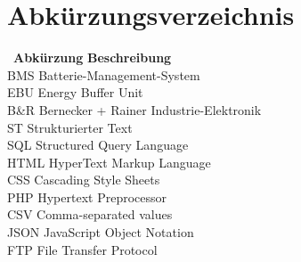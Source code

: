 
\chapter*{Abkürzungsverzeichnis}\thispagestyle{fancy}

\begin{tabbing}
\ \= \textbf{Abkürzung} \hspace{0.5cm} \= \textbf{Beschreibung} \kill
\\

\> BMS \>   Batterie-Management-System\\
\> EBU \>   Energy Buffer Unit\\
\> B\&R \>		Bernecker + Rainer Industrie-Elektronik\\
\> ST \>   Strukturierter Text\\
\> SQL \>   Structured Query Language\\
\> HTML \>  HyperText Markup Language \\
\> CSS \>   Cascading Style Sheets\\
\> PHP \>   Hypertext Preprocessor\\
\> CSV \>   Comma-separated values\\
\> JSON \>  JavaScript Object Notation\\
\> FTP \>   File Transfer Protocol\\



\end{tabbing}
